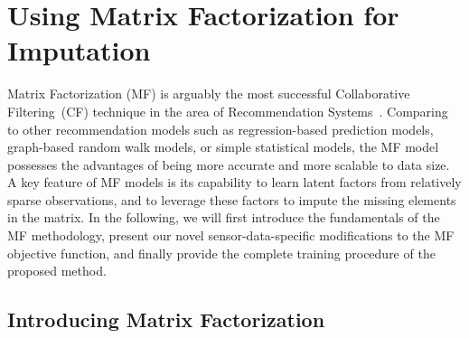\section{Using Matrix Factorization for Imputation}  \label{sec:mf}


Matrix Factorization (MF) is arguably the most successful Collaborative Filtering~(CF) technique in the area of Recommendation Systems~\cite{koren2009matrix, chen2011linear}. Comparing to other recommendation models such as regression-based prediction models, graph-based random walk models, or simple statistical models, the MF model possesses the advantages of being more accurate and more scalable to data size.
A key feature of MF models is its capability to learn latent factors from relatively sparse observations, and to leverage these factors to impute the missing elements in the matrix.
In the following, we will first introduce the fundamentals of the MF methodology, present our novel sensor-data-specific 
modifications to the MF objective function, and finally provide the complete training procedure of the proposed method.

\subsection{Introducing Matrix Factorization}

